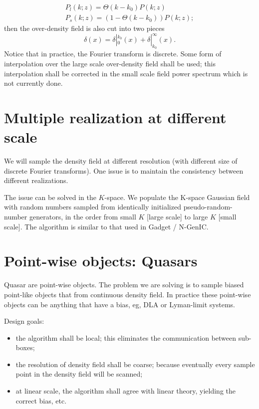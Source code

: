\documentclass{paper}
\begin{document}
    \begin{eqnarray*}
        P_l(k; z) = \Theta(k - k_0)P(k; z) \\
        P_s(k; z) = (1 - \Theta(k - k_0)) P(k; z);
    \end{eqnarray*}
    then the over-density field is also cut into two pieces
    \[
        \delta(x) = \delta|_{0}^{k_0}(x) +
        \delta|_{k_0}^{\infty}(x).
    \]
    Notice that in practice, the Fourier transform is discrete.
    Some form of interpolation over the large scale over-density field
    shall be used; this interpolation shall be corrected in the small scale
    field power spectrum which is not currently done.

\section{Multiple realization at different scale}
    We will sample the density field at different
    resolution (with different size of discrete Fourier transforms).    
    One issue is to maintain the consistency between different
    realizations. 

    The issue can be solved in the $K$-space.  We populate the K-space
    Gaussian field with random numbers sampled
    from identically initialized pseudo-random-number generators, in
    the order from small $K$ [large scale] to large $K$ [small scale].
    The algorithm is similar to that used in \small{Gadget}
    / \small{N-GenIC}.

\section{Point-wise objects: Quasars}
    Quasar are point-wise objects. The problem we are
    solving is to sample biased point-like objects that
    from continuous density field. In practice these
    point-wise objects can be anything that have a bias, eg, 
    DLA or Lyman-limit systems.

    Design goals:
    \begin{itemize}
        \item the algorithm shall be local; this eliminates the 
              communication between sub-boxes;
        \item the resolution of density field shall be coarse; 
              because eventually every sample point in the density
              field will be scanned;
        \item at linear scale, the algorithm shall agree
              with linear theory, yielding the correct bias,
              etc.
    \end{itemize}
\end{document}
